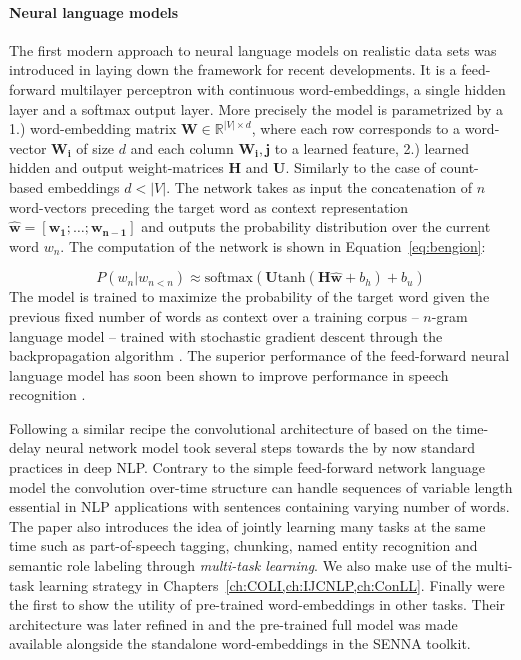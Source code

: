 \paragraph{Neural language models}
The first modern approach to neural language models on realistic data sets was introduced
in \cite{bengio2003neural} laying down the framework for recent developments.
It is a feed-forward multilayer perceptron with continuous word-embeddings,
a single hidden layer and a softmax output layer.
More precisely the model is parametrized by a 1.) word-embedding matrix
$\mathbf{W} \in \mathbb{R}^{|V| \times d}$, where each row corresponds to a word-vector
$\mathbf{W_i}$ of size $d$ and each column $\mathbf{W_i,j}$ to a learned feature, 2.)
learned hidden and output weight-matrices $\mathbf{H}$ and $\mathbf{U}$. Similarly
to the case of count-based embeddings $d < |V|$.
The network takes as input the concatenation of $n$ word-vectors preceding the target word as context
representation $\hat{\mathbf{w}} = [\mathbf{w_1}; \ldots; \mathbf{w_{n-1}}]$
and outputs the probability distribution over the current word $w_n$.
The computation of the network is shown in Equation~\ref{eq:bengion}:

\begin{equation}
\label{eq:bengio}
P(w_n|w_{n<n}) \approx \text{softmax}(\mathbf{U} \text{tanh}(\mathbf{H} \mathbf{\hat{w}} + b_h ) + b_u)
\end{equation}
The model is trained to maximize the probability of
the target word given the previous fixed number of words as context over a training corpus
-- $n$-gram language model -- trained with stochastic gradient descent \cite{cauchy1847methode}
through the backpropagation algorithm \cite{rumelhart1985learning}.
The superior performance of the feed-forward neural language model has soon been shown to
improve performance in speech recognition \cite{schwenk2005training}.

Following a similar recipe the convolutional architecture of  \cite{collobert2008unified}
based on the time-delay neural network model \cite{waibel1990phoneme} took several steps towards the
by now standard practices in deep NLP.
Contrary to the simple feed-forward network language model the convolution over-time structure can handle
sequences of variable length essential in NLP applications with sentences containing varying number of words.
The paper also introduces the idea of jointly learning many tasks at the same time such as part-of-speech
tagging, chunking, named entity recognition and semantic role labeling through \emph{multi-task learning}.
We also make use of the multi-task learning strategy in Chapters~\ref{ch:COLI,ch:IJCNLP,ch:ConLL}.
Finally \cite{collobert2008unified} were the first to show the utility of pre-trained word-embeddings
in other tasks. Their architecture was later refined in \cite{collobert2011natural} and the pre-trained
full model was made available alongside the standalone word-embeddings in the SENNA toolkit.

